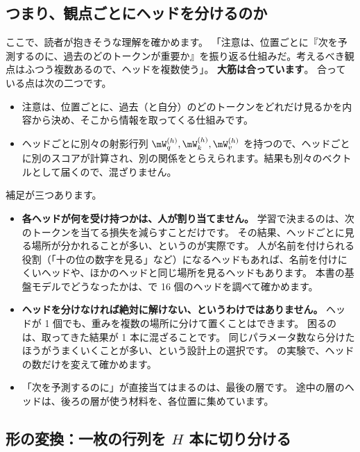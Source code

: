 \subsection*{つまり、観点ごとにヘッドを分けるのか}

ここで、読者が抱きそうな理解を確かめます。
「注意は、位置ごとに『次を予測するのに、過去のどのトークンが重要か』を振り返る仕組みだ。考えるべき観点はふつう複数あるので、ヘッドを複数使う」。
\textbf{大筋は合っています}。
合っている点は次の二つです。
\begin{itemize}
\item 注意は、位置ごとに、過去（と自分）のどのトークンをどれだけ見るかを内容から決め、そこから情報を取ってくる仕組みです。
\item ヘッドごとに別々の射影行列 $\mW_q^{(h)},\mW_k^{(h)},\mW_v^{(h)}$ を持つので、ヘッドごとに別のスコアが計算され、別の関係をとらえられます。結果も別々のベクトルとして届くので、混ざりません。
\end{itemize}
補足が三つあります。
\begin{itemize}
\item \textbf{各ヘッドが何を受け持つかは、人が割り当てません。}
学習で決まるのは、次のトークンを当てる損失を減らすことだけです。
その結果、ヘッドごとに見る場所が分かれることが多い、というのが実際です。
人が名前を付けられる役割（「十の位の数字を見る」など）になるヘッドもあれば、名前を付けにくいヘッドや、ほかのヘッドと同じ場所を見るヘッドもあります。
本書の基盤モデルでどうなったかは、で 16 個のヘッドを調べて確かめます。
\item \textbf{ヘッドを分けなければ絶対に解けない、というわけではありません。}
ヘッドが 1 個でも、重みを複数の場所に分けて置くことはできます。
困るのは、取ってきた結果が 1 本に混ざることです。
同じパラメータ数なら分けたほうがうまくいくことが多い、という設計上の選択です。
の実験で、ヘッドの数だけを変えて確かめます。
\item 「次を予測するのに」が直接当てはまるのは、最後の層です。
途中の層のヘッドは、後ろの層が使う材料を、各位置に集めています。
\end{itemize}

\subsection*{形の変換：一枚の行列を $H$ 本に切り分ける}


